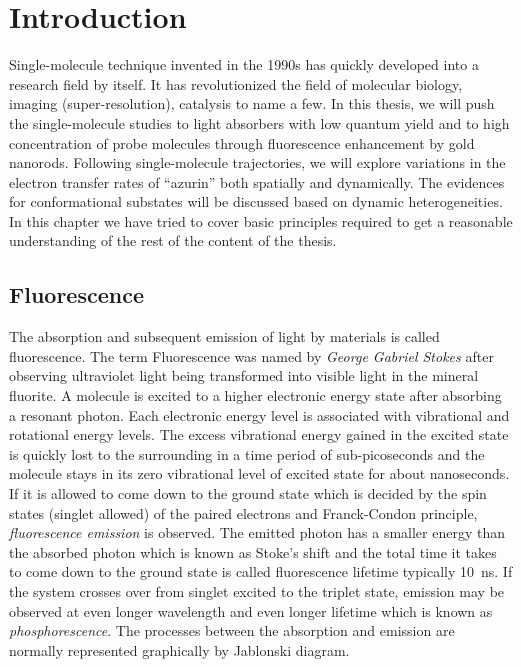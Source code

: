 \chapter{Introduction}
\label{chapter:intro}
\graphicspath{{./chapters/c1_intro/figures/}}
Single-molecule technique invented in the 1990s has quickly developed into a research field by itself. It has revolutionized the field of molecular biology, imaging (super-resolution), catalysis to name a few. In this thesis, we will push the single-molecule studies to light absorbers with low quantum yield and to high concentration of probe molecules through fluorescence enhancement by gold nanorods. Following single-molecule trajectories, we will explore variations in the electron transfer rates of ``azurin'' both spatially and dynamically. The evidences for conformational substates will be discussed based on dynamic heterogeneities. In this chapter we have tried to cover basic principles required to get a reasonable understanding of the rest of the content of the thesis.  

\section{Fluorescence}
The absorption and subsequent emission of light by materials is called fluorescence.
The term Fluorescence was named by \textit{George Gabriel Stokes} after observing ultraviolet light being transformed into visible light in the mineral fluorite.\cite{Stokes1852}
A molecule is excited to a higher electronic energy state after absorbing a resonant photon.
Each electronic energy level is associated with vibrational and rotational energy levels.
The excess vibrational energy gained in the excited state is quickly lost to the surrounding in a time period of sub-picoseconds and the molecule stays in its zero vibrational level of excited state for about nanoseconds.
If it is allowed to come down to the ground state which is decided by the spin states (singlet allowed) of the paired electrons and Franck-Condon principle, \textit{fluorescence emission} is observed.
The emitted photon has a smaller energy than the absorbed photon which is known as Stoke's shift and the total time it takes to come down to the ground state is called fluorescence lifetime typically \SI{10}{\ns}.
If the system crosses over from singlet excited to the triplet state, emission may be observed at even longer wavelength and even longer lifetime which is known as \textit{phosphorescence}.
The processes between the absorption and emission are normally represented graphically by Jablonski diagram.\cite{RohatgiMukherjee1979k,Lakowicz1999book}

